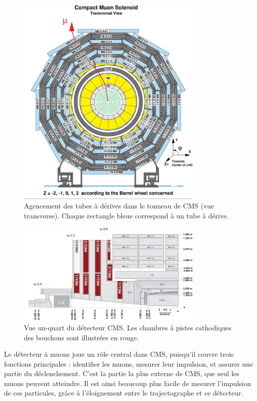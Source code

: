 \begin{figure} \centering
  \includegraphics[width=0.8\textwidth]{chapitre2/figs/CMS_transverse_view.pdf}
  \caption{Agencement des tubes à dérives dans le tonneau de CMS (vue transverse). Chaque rectangle bleue correspond à un tube à dérive.}
  \label{fig:cms_dt}
\end{figure}

\begin{figure} \centering
  \includegraphics[width=0.8\textwidth]{chapitre2/figs/CSC.pdf}
  \caption{Vue un-quart du détecteur CMS. Les chambres à pistes cathodiques des bouchons sont illustrées en rouge.}
  \label{fig:cms_csc}
\end{figure}

Le détecteur à muons joue un rôle central dans CMS, puisqu'il couvre trois fonctions principales : identifier les muons, mesurer leur impulsion, et assurer une partie du déclenchement. C'est la partie la plus externe de CMS, que seul les muons peuvent atteindre. Il est ainsi beaucoup plus facile de mesurer l'impulsion de ces particules, grâce à l'éloignement entre le trajectographe et ce détecteur.

